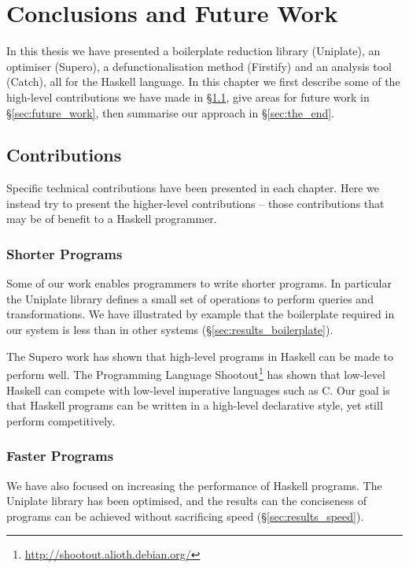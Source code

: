 
\chapter{Conclusions and Future Work}

In this thesis we have presented a boilerplate reduction library (Uniplate), an optimiser (Supero), a defunctionalisation method (Firstify) and an analysis tool (Catch), all for the Haskell language. In this chapter we first describe some of the high-level contributions we have made in \S\ref{sec:contributions}, give areas for future work in \S\ref{sec:future_work}, then summarise our approach in \S\ref{sec:the_end}.


\section{Contributions}
\label{sec:contributions}

Specific technical contributions have been presented in each chapter. Here we instead try to present the higher-level contributions -- those contributions that may be of benefit to a Haskell programmer.

\subsection{Shorter Programs}

Some of our work enables programmers to write shorter programs. In particular the Uniplate library defines a small set of operations to perform queries and transformations. We have illustrated by example that the boilerplate required in our system is less than in other systems (\S\ref{sec:results_boilerplate}).

The Supero work has shown that high-level programs in Haskell can be made to perform well. The Programming Language Shootout\footnote{\url{http://shootout.alioth.debian.org/}} has shown that low-level Haskell can compete with low-level imperative languages such as C. Our goal is that Haskell programs can be written in a high-level declarative style, yet still perform competitively.

\subsection{Faster Programs}

We have also focused on increasing the performance of Haskell programs. The Uniplate library has been optimised, and the results can the conciseness of programs can be achieved without sacrificing speed (\S\ref{sec:results_speed}).

